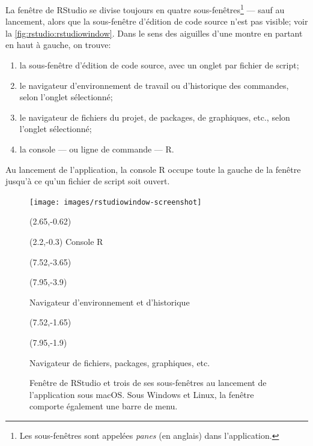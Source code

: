 La fenêtre de RStudio se divise toujours en quatre
sous-fenêtres\footnote{%
  Les sous-fenêtres sont appelées \emph{panes} (en anglais) dans
  l'application.} %
--- sauf au lancement, alors que la sous-fenêtre d'édition de code
source n'est pas visible; voir la \autoref{fig:rstudio:rstudiowindow}.
Dans le sens des aiguilles d'une montre en partant en haut à gauche,
on trouve:
\begin{enumerate}
\item la sous-fenêtre d'édition de code source, avec un onglet par
  fichier de script;
\item le navigateur d'environnement de travail ou d'historique des
  commandes, selon l'onglet sélectionné;
\item le navigateur de fichiers du projet, de packages, de graphiques,
  etc., selon l'onglet sélectionné;
\item la console --- ou ligne de commande --- R.
\end{enumerate}
Au lancement de l'application, la console R occupe toute la gauche de
la fenêtre jusqu'à ce qu'un fichier de script soit ouvert.

\begin{figure}[t]
  \texttt{[image: images/rstudiowindow-screenshot]}
  \vspace{0.5\TPVertModule}

  \begingroup
  \begin{textblock}{0.5}(2.65,-0.62)
    \large\faLongArrowAltDown
  \end{textblock}
  \begin{textblock}{2}(2.2,-0.3)
    \footnotesize\sffamily Console R
  \end{textblock}

  \begin{textblock}{1}(7.52,-3.65)
    \large\faLongArrowAltRight
  \end{textblock}
  \begin{textblock}{2.2}(7.95,-3.9)
    \footnotesize\sffamily\raggedright Navigateur d'environnement et d'historique
  \end{textblock}

  \begin{textblock}{1}(7.52,-1.65)
    \large\faLongArrowAltRight
  \end{textblock}
  \begin{textblock}{2.2}(7.95,-1.9)
    \footnotesize\sffamily\raggedright Navigateur de fichiers, packages, graphiques, etc.
  \end{textblock}
  \endgroup
  \caption[Fenêtre de RStudio sous macOS]{Fenêtre de RStudio et trois
    de ses sous-fenêtres au lancement de l'application sous macOS.
    Sous Windows et Linux, la fenêtre comporte également une barre de
    menu.}
  \label{fig:rstudio:rstudiowindow}
\end{figure}


